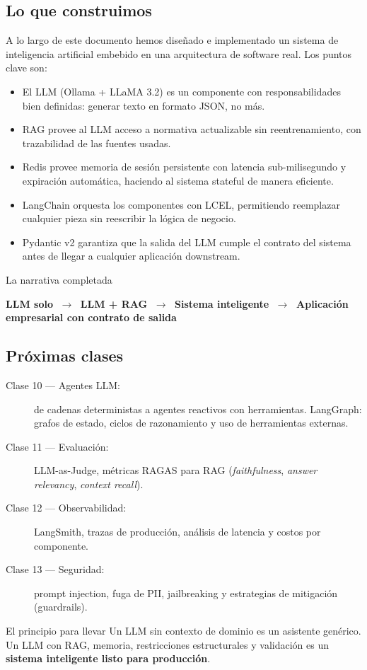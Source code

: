\documentclass[12pt,a4paper]{article}
\begin{document}
\subsection{Lo que construimos}

A lo largo de este documento hemos diseñado e implementado un sistema
de inteligencia artificial embebido en una arquitectura de software real.
Los puntos clave son:

\begin{itemize}
  \item El LLM (Ollama + LLaMA 3.2) es un componente con responsabilidades
    bien definidas: generar texto en formato JSON, no más.
  \item RAG provee al LLM acceso a normativa actualizable sin reentrenamiento,
    con trazabilidad de las fuentes usadas.
  \item Redis provee memoria de sesión persistente con latencia sub-milisegundo
    y expiración automática, haciendo al sistema stateful de manera eficiente.
  \item LangChain orquesta los componentes con LCEL, permitiendo reemplazar
    cualquier pieza sin reescribir la lógica de negocio.
  \item Pydantic v2 garantiza que la salida del LLM cumple el contrato del
    sistema antes de llegar a cualquier aplicación downstream.
\end{itemize}

\begin{examplebox}{La narrativa completada}
\begin{center}
\textbf{LLM solo}
$\;\longrightarrow\;$
\textbf{LLM + RAG}
$\;\longrightarrow\;$
\textbf{Sistema inteligente}
$\;\longrightarrow\;$
\textbf{Aplicación empresarial con contrato de salida}
\end{center}
\end{examplebox}

\subsection{Próximas clases}

\begin{description}
  \item[Clase 10 --- Agentes LLM:] de cadenas deterministas a agentes
    reactivos con herramientas. LangGraph: grafos de estado, ciclos de
    razonamiento y uso de herramientas externas.
  \item[Clase 11 --- Evaluación:] LLM-as-Judge, métricas RAGAS para RAG
    (\textit{faithfulness}, \textit{answer relevancy}, \textit{context recall}).
  \item[Clase 12 --- Observabilidad:] LangSmith, trazas de producción,
    análisis de latencia y costos por componente.
  \item[Clase 13 --- Seguridad:] prompt injection, fuga de PII,
    jailbreaking y estrategias de mitigación (guardrails).
\end{description}

\begin{conceptbox}{El principio para llevar}
Un LLM sin contexto de dominio es un asistente genérico.\\
Un LLM con RAG, memoria, restricciones estructurales y validación
es un \textbf{sistema inteligente listo para producción}.
\end{conceptbox}
\end{document}
